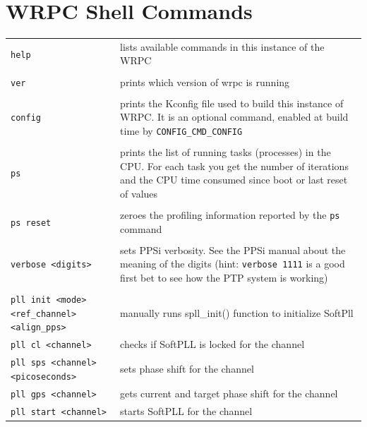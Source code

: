 \documentclass[a4paper, 12pt]{article}
\newcommand{\code}[1]{\texttt{#1}}
\begin{document}


\appendix
\clearpage
\section{WRPC Shell Commands}
\label{WRPC Shell commands}

\footnotesize
\begin{longtable}{  p{7.5cm}  p{7cm} }

  \code{help} & lists available commands in this instance of the WRPC \\
 & \\
  \code{ver} & prints which version of wrpc is running \\
 & \\
  \code{config} & prints the Kconfig file used to build this instance of
WRPC. It is an optional command, enabled at build time by
\texttt{CONFIG\_CMD\_CONFIG} \\
 & \\
  \code{ps} & prints the list of running tasks (processes) in the CPU.
For each task you get the number of iterations and the CPU time consumed
since boot or last reset of values\\
 & \\
  \code{ps reset} & zeroes the profiling information reported by
the \code{ps} command\\
 & \\
  \code{verbose <digits>} & sets PPSi verbosity. See the PPSi manual
about the meaning of the digits (hint: \texttt{verbose 1111} is a good first bet to
see how the PTP system is working) \\
 & \\
  \code{pll init <mode> <ref\_channel> <align\_pps>} & manually runs
spll\_init() function to initialize SoftPll \\

  \code{pll cl <channel>} & checks if SoftPLL is locked for the channel\\

  \code{pll sps <channel> <picoseconds>} & sets phase shift for the channel\\

  \code{pll gps <channel>} & gets current and target phase shift for the channel\\

  \code{pll start <channel>} & starts SoftPLL for the channel\\


\end{longtable}
\end{document}
